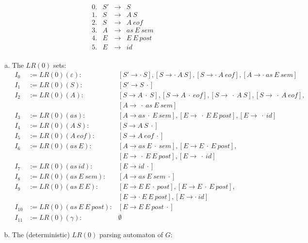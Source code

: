 \begin{solution}
\newcommand{\eof}{eo\!f}

\[
 \begin{array}{llcl}
  0. & S' & \to & S\\
  1. & S & \to & A\ S\\
  2. & S & \to & A\ \eof \\
  3. & A & \to & as\ E\ sem \\
  4. & E & \to & E\ E\ post \\
  5. & E & \to & id \\
 \end{array}
\]

\begin{enumerate}[(a)]
  \item The $LR(0)$ sets:
\[
  \begin{array}{rll}
  I_0 &:= LR(0)(\varepsilon): & [S' \to \cdot\ S], [S \to \cdot\ A\ S], [S \to \cdot\ A\ \eof], [A \to \cdot\ as\ E\ sem]\\
  I_1 &:= LR(0)(S): & [S' \to S\ \cdot]\\
  I_2 &:= LR(0)(A): & [S \to A\ \cdot\ S], [S \to A\ \cdot\ \eof], [S \to\ \cdot\ A\ S], [S \to\ \cdot\ A\ \eof],\\
                    && [A \to\ \cdot\ as\ E\ sem]\\
  I_3 &:= LR(0)(as): & [A \to as\ \cdot\ E\ sem], [E \to\ \cdot\ E\ E\ post], [E \to\ \cdot\ id]\\
  I_4 &:= LR(0)(A\ S): & [S \to A\ S\ \cdot]\\
  I_5 &:= LR(0)(A\ \eof): & [S \to A\ \eof\ \cdot]\\
  I_6 &:= LR(0)(as\ E): & [A \to as\ E\ \cdot\ sem], [E \to E\ \cdot\ E\ post],\\
                        && [E \to\ \cdot\ E\ E\ post], [E \to\ \cdot\ id]\\
  I_7 &:= LR(0)(as\ id): & [E \to id\ \cdot]\\
  I_8 &:= LR(0)(as\ E\ sem): & [A \to as\ E\ sem\ \cdot]\\
  I_9 &:= LR(0)(as\ E\ E): & [E \to E\ E\ \cdot\ post], [E \to E\ \cdot\ E\ post], \\
                           && [E \to \cdot\ E\ E\ post], [E \to \cdot\ id]\\
  I_{10} &:= LR(0)(as\ E\ E\ post): & [E \to E\ E\ post\ \cdot]\\
  I_{11} &:= LR(0)(\gamma): & \emptyset
  \end{array}
\]
  \item The (deterministic) $LR(0)$ parsing automaton of $G$:

\end{enumerate}
\end{solution}
